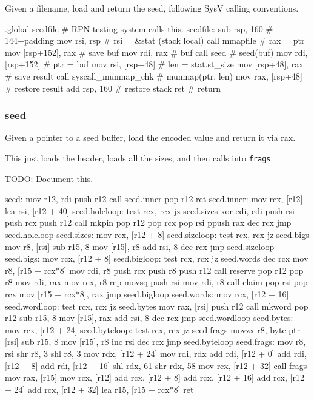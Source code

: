 Given a filename, load and return the seed, following SysV calling
conventions.

\begin{asm}
.global seedfile # RPN testing system calls this.
seedfile:
	sub	rsp, 160                 # 144+padding
	mov	rsi, rsp                 # rsi = &stat (stack local)
	call	mmapfile                 # rax = ptr
	mov	[rsp+152], rax           # save buf
	mov	rdi, rax                 # buf
	call	seed                     # seed(buf)
	mov	rdi, [rsp+152]           # ptr = buf
	mov	rsi, [rsp+48]            # len = stat.st_size
	mov	[rsp+48], rax            # save result
	call	syscall_munmap_chk       # munmap(ptr, len)
	mov	rax, [rsp+48]            # restore result
	add	rsp, 160                 # restore stack
	ret                              # return
\end{asm}

\subsubsection{seed}

Given a pointer to a seed buffer, load the encoded value and return it
via rax.

This just loads the header, loads all the sizes, and then calls into
\lstinline|frags|.

TODO: Document this.

\begin{asm}
seed:
	mov	r12, rdi
	push	r12
	call	seed.inner
	pop	r12
	ret
seed.inner:
	mov	rcx, [r12]
	lea	rsi, [r12 + 40]
seed.holeloop:
	test	rcx, rcx
	jz	seed.sizes
	xor	edi, edi
	push	rsi
	push	rcx
	push	r12
	call	mkpin
	pop	r12
	pop	rcx
	pop	rsi
	ppush	rax
	dec	rcx
	jmp	seed.holeloop
seed.sizes:
	mov	rcx, [r12 + 8]
seed.sizeloop:
	test	rcx, rcx
	jz	seed.bigs
	mov	r8, [rsi]
	sub	r15, 8
	mov	[r15], r8
	add	rsi, 8
	dec	rcx
	jmp	seed.sizeloop
seed.bigs:
	mov	rcx, [r12 + 8]
seed.bigloop:
	test	rcx, rcx
	jz	seed.words
	dec	rcx
	mov	r8, [r15 + rcx*8]
	mov	rdi, r8
	push	rcx
	push	r8
	push	r12
	call	reserve
	pop	r12
	pop	r8
	mov	rdi, rax
	mov	rcx, r8
	rep	movsq
	push	rsi
	mov	rdi, r8
	call	claim
	pop	rsi
	pop	rcx
	mov	[r15 + rcx*8], rax
	jmp	seed.bigloop
seed.words:
	mov	rcx, [r12 + 16]
seed.wordloop:
	test	rcx, rcx
	jz	seed.bytes
	mov	rax, [rsi]
	push	r12
	call	mkword
	pop	r12
	sub	r15, 8
	mov	[r15], rax
	add	rsi, 8
	dec	rcx
	jmp	seed.wordloop
seed.bytes:
	mov	rcx, [r12 + 24]
seed.byteloop:
	test	rcx, rcx
	jz	seed.frags
	movzx	r8, byte ptr [rsi]
	sub	r15, 8
	mov	[r15], r8
	inc	rsi
	dec	rcx
	jmp	seed.byteloop
seed.frags:
	mov	r8, rsi
	shr	r8, 3
	shl	r8, 3
	mov	rdx, [r12 + 24]
	mov	rdi, rdx
	add	rdi, [r12 + 0]
	add	rdi, [r12 + 8]
	add	rdi, [r12 + 16]
	shl	rdx, 61
	shr	rdx, 58
	mov	rcx, [r12 + 32]
	call	frags
	mov	rax, [r15]
	mov	rcx, [r12]
	add	rcx, [r12 + 8]
	add	rcx, [r12 + 16]
	add	rcx, [r12 + 24]
	add	rcx, [r12 + 32]
	lea	r15, [r15 + rcx*8]
	ret
\end{asm}

